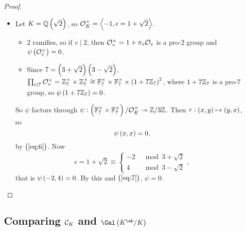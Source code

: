 \begin{proof}
\begin{itemize}
\item Let $ K = \QQ\br{\sqrt{2}} $, so $ \mathcal{O}_K^\times = \left\langle -1, \epsilon = 1 + \sqrt{2} \right\rangle $.
\begin{itemize}
\item $ 2 $ ramifies, so if $ v \mid 2 $, then $ \mathcal{O}_v^\times = 1 + \pi_v\mathcal{O}_v $ is a pro-$ 2 $ group and $ \psi\br{\OOO_v^\times} = 0 $.
\item Since $ 7 = \br{3 + \sqrt{2}}\br{3 - \sqrt{2}} $, $ \prod_{v \mid 7} \OOO_v^\times = \ZZ_7^\times \times \ZZ_7^\times \cong \FF_7^\times \times \FF_7^\times \times \br{1 + 7\ZZ_7}^2 $, where $ 1 + 7\mathbb{Z}_7 $ is a pro-$ 7 $ group, so $ \psi\br{1 + 7\ZZ_7} = 0 $.
\end{itemize}
So $ \psi $ factors through $ \psi : \br{\FF_7^\times \times \FF_7^\times} / \OOO_K^\times \twoheadrightarrow \ZZ / 3\ZZ $. Then $ \tau : \br{x, y} \mapsto \br{y, x} $, so
\begin{equation}
\label{eq:7}
\psi\br{x, x} = 0,
\end{equation}
by $ \br{\ref{eq:6}} $. Now
$$ \epsilon = 1 + \sqrt{2} \equiv
\begin{cases}
-2 & \mod 3 + \sqrt{2} \\
4 & \mod 3 - \sqrt{2}
\end{cases},
$$
that is $ \psi\br{-2, 4} = 0 $. By this and $ \br{\ref{eq:7}} $, $ \psi = 0 $.
\end{itemize}
\end{proof}

\pagebreak

\subsection{Comparing \texorpdfstring{$ \mathcal{C}_K $}{idele class group} and \texorpdfstring{$ \Gal\br{K^{\ab} / K} $}{Galois group of maximal abelian extension}}

